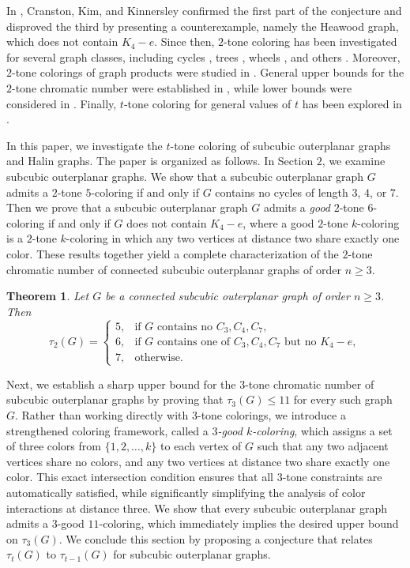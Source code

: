 \documentclass[12pt]{article}
\newtheorem{theorem}{Theorem}
\numberwithin{theorem}{section}
\numberwithin{conjecture}{section}
\numberwithin{corollary}{section}
\numberwithin{example}{section}
\numberwithin{lemma}{section}
\numberwithin{proposition}{section}
\numberwithin{problem}{section}
\numberwithin{remark}{section}
\numberwithin{claim}{theorem}
\numberwithin{definition}{section}
\begin{document}
\noindent In \cite{C1}, Cranston, Kim, and Kinnersley confirmed the first part of the conjecture and disproved the third by presenting a counterexample, namely the Heawood graph, which does not contain $K_4-e$. Since then, $2$-tone coloring has been investigated for several graph classes, including cycles \cite{BP}, trees \cite{F, BP}, wheels \cite{B1}, and others \cite{r, BN, B2, B3, B4, BP, C1, C2, Dong1, Dong2, WuThesis, YangThesis}. Moreover, $2$-tone colorings of graph products were studied in \cite{B1, Cooper, Loe}. General upper bounds for the $2$-tone chromatic number were established in \cite{B1, C1, C2, Dong1, Dong2}, while lower bounds were considered in \cite{Pan}. Finally, $t$-tone coloring for general values of $t$ has been explored in \cite{C2, WuThesis, YangThesis}.

\noindent In this paper, we investigate the $t$-tone coloring of subcubic outerplanar graphs and Halin graphs. The paper is organized as follows. In Section $2$, we examine subcubic outerplanar graphs. We show that a subcubic outerplanar graph $G$ admits a $2$-tone $5$-coloring if and only if $G$ contains no cycles of length $3$, $4$, or $7$. Then we prove that a subcubic outerplanar graph $G$ admits a \emph{good} $2$-tone $6$-coloring if and only if $G$ does not contain $K_4-e$, where a good $2$-tone $k$-coloring is a $2$-tone $k$-coloring in which any two vertices at distance two share exactly one color. These results together yield a complete characterization of the $2$-tone chromatic number of connected subcubic outerplanar graphs of order $n \ge 3$.
\begin{theorem}
Let $G$ be a connected subcubic outerplanar graph of order $n \ge 3$. Then
\[
\tau_2(G)=
\begin{cases}
5, & \text{if } G \text{ contains no } C_3,C_4,C_7,\\
6, & \text{if } G \text{ contains one of } C_3,C_4,C_7 \text{ but no } K_4-e,\\
7, & \text{otherwise}.
\end{cases}
\]
\end{theorem}
\noindent Next, we establish a sharp upper bound for the $3$-tone chromatic number of subcubic outerplanar graphs by proving that $\tau_3(G)\le 11$ for every such graph $G$. Rather than working directly with $3$-tone colorings, we introduce a strengthened coloring framework, called a \emph{$3$-good $k$-coloring}, which assigns a set of three colors from $\{1,2,\dots,k\}$ to each vertex of $G$ such that any two adjacent vertices share no colors, and any two vertices at distance two share exactly one color. This exact intersection condition ensures that all $3$-tone constraints are automatically satisfied, while significantly simplifying the analysis of color interactions at distance three. We show that every subcubic outerplanar graph admits a $3$-good $11$-coloring, which immediately implies the desired upper bound on $\tau_3(G)$. We conclude this section by proposing a conjecture that relates $\tau_t(G)$ to $\tau_{t-1}(G)$ for subcubic outerplanar graphs.
\end{document}
